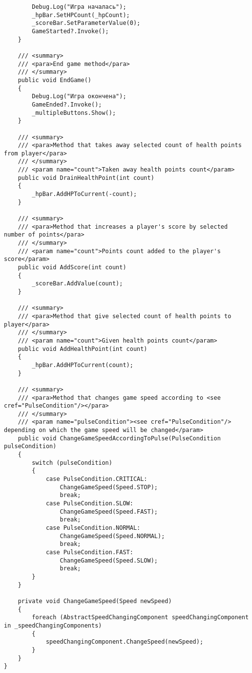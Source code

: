 \begin{verbatim}
        Debug.Log("Игра началась");
        _hpBar.SetHPCount(_hpCount);
        _scoreBar.SetParameterValue(0);
        GameStarted?.Invoke();
    }

    /// <summary>
    /// <para>End game method</para>
    /// </summary>
    public void EndGame()
    {
        Debug.Log("Игра окончена");
        GameEnded?.Invoke();
        _multipleButtons.Show();
    }

    /// <summary>
    /// <para>Method that takes away selected count of health points from player</para>
    /// </summary>
    /// <param name="count">Taken away health points count</param>
    public void DrainHealthPoint(int count)
    {
        _hpBar.AddHPToCurrent(-count);
    }

    /// <summary>
    /// <para>Method that increases a player's score by selected number of points</para>
    /// </summary>
    /// <param name="count">Points count added to the player's score</param>
    public void AddScore(int count)
    {
        _scoreBar.AddValue(count);
    }

    /// <summary>
    /// <para>Method that give selected count of health points to player</para>
    /// </summary>
    /// <param name="count">Given health points count</param>
    public void AddHealthPoint(int count)
    {
        _hpBar.AddHPToCurrent(count);
    }

    /// <summary>
    /// <para>Method that changes game speed according to <see cref="PulseCondition"/></para>
    /// </summary>
    /// <param name="pulseCondition"><see cref="PulseCondition"/> depending on which the game speed will be changed</param>
    public void ChangeGameSpeedAccordingToPulse(PulseCondition pulseCondition)
    {
        switch (pulseCondition)
        {
            case PulseCondition.CRITICAL:
                ChangeGameSpeed(Speed.STOP);
                break;
            case PulseCondition.SLOW:
                ChangeGameSpeed(Speed.FAST);
                break;
            case PulseCondition.NORMAL:
                ChangeGameSpeed(Speed.NORMAL);
                break;
            case PulseCondition.FAST:
                ChangeGameSpeed(Speed.SLOW);
                break;
        }
    }

    private void ChangeGameSpeed(Speed newSpeed)
    {
        foreach (AbstractSpeedChangingComponent speedChangingComponent in _speedChangingComponents)
        {
            speedChangingComponent.ChangeSpeed(newSpeed);
        }
    }
}
\end{verbatim}
